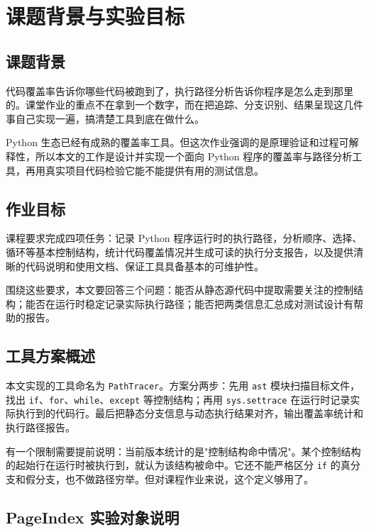 
\chapter{课题背景与实验目标}
\label{chap:background}

\section{课题背景}

代码覆盖率告诉你哪些代码被跑到了，执行路径分析告诉你程序是怎么走到那里的。课堂作业的重点不在拿到一个数字，而在把追踪、分支识别、结果呈现这几件事自己实现一遍，搞清楚工具到底在做什么。

Python 生态已经有成熟的覆盖率工具。但这次作业强调的是原理验证和过程可解释性，所以本文的工作是设计并实现一个面向 Python 程序的覆盖率与路径分析工具，再用真实项目代码检验它能不能提供有用的测试信息。

\section{作业目标}

课程要求完成四项任务：记录 Python 程序运行时的执行路径，分析顺序、选择、循环等基本控制结构，统计代码覆盖情况并生成可读的执行分支报告，以及提供清晰的代码说明和使用文档、保证工具具备基本的可维护性。

围绕这些要求，本文要回答三个问题：能否从静态源代码中提取需要关注的控制结构；能否在运行时稳定记录实际执行路径；能否把两类信息汇总成对测试设计有帮助的报告。

\section{工具方案概述}

本文实现的工具命名为 \texttt{PathTracer}。方案分两步：先用 \texttt{ast} 模块扫描目标文件，找出 \texttt{if}、\texttt{for}、\texttt{while}、\texttt{except} 等控制结构；再用 \texttt{sys.settrace} 在运行时记录实际执行到的代码行。最后把静态分支信息与动态执行结果对齐，输出覆盖率统计和执行路径报告。

有一个限制需要提前说明：当前版本统计的是"控制结构命中情况"。某个控制结构的起始行在运行时被执行到，就认为该结构被命中。它还不能严格区分 \texttt{if} 的真分支和假分支，也不做路径穷举。但对课程作业来说，这个定义够用了。

\section{PageIndex 实验对象说明}

